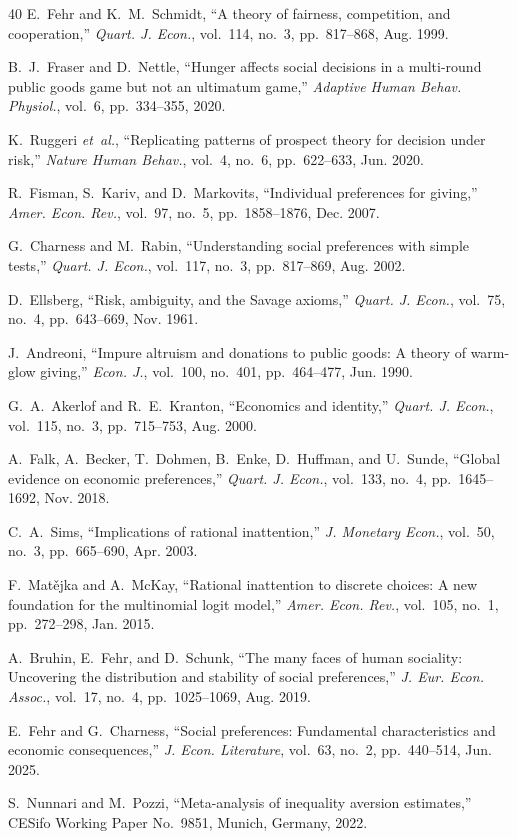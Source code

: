 \documentclass[journal]{IEEEtran}
\begin{document}
\begin{thebibliography}{40}
E.~Fehr and K.~M.~Schmidt, ``A theory of fairness, competition, and cooperation,''
\emph{Quart. J. Econ.}, vol.~114, no.~3, pp.~817--868, Aug. 1999.

B.~J.~Fraser and D.~Nettle, ``Hunger affects social decisions in a multi-round public goods game but not an ultimatum game,''
\emph{Adaptive Human Behav. Physiol.}, vol.~6, pp.~334--355, 2020.

K.~Ruggeri \emph{et~al.}, ``Replicating patterns of prospect theory for decision under risk,''
\emph{Nature Human Behav.}, vol.~4, no.~6, pp.~622--633, Jun. 2020.

R.~Fisman, S.~Kariv, and D.~Markovits, ``Individual preferences for giving,''
\emph{Amer. Econ. Rev.}, vol.~97, no.~5, pp.~1858--1876, Dec. 2007.

G.~Charness and M.~Rabin, ``Understanding social preferences with simple tests,''
\emph{Quart. J. Econ.}, vol.~117, no.~3, pp.~817--869, Aug. 2002.

D.~Ellsberg, ``Risk, ambiguity, and the Savage axioms,''
\emph{Quart. J. Econ.}, vol.~75, no.~4, pp.~643--669, Nov. 1961.

J.~Andreoni, ``Impure altruism and donations to public goods: A theory of warm-glow giving,''
\emph{Econ. J.}, vol.~100, no.~401, pp.~464--477, Jun. 1990.

G.~A.~Akerlof and R.~E.~Kranton, ``Economics and identity,''
\emph{Quart. J. Econ.}, vol.~115, no.~3, pp.~715--753, Aug. 2000.

A.~Falk, A.~Becker, T.~Dohmen, B.~Enke, D.~Huffman, and U.~Sunde, ``Global evidence on economic preferences,''
\emph{Quart. J. Econ.}, vol.~133, no.~4, pp.~1645--1692, Nov. 2018. %

C.~A.~Sims, ``Implications of rational inattention,''
\emph{J. Monetary Econ.}, vol.~50, no.~3, pp.~665--690, Apr. 2003.

F.~Mat\v{e}jka and A.~McKay, ``Rational inattention to discrete choices: A new foundation for the multinomial logit model,''
\emph{Amer. Econ. Rev.}, vol.~105, no.~1, pp.~272--298, Jan. 2015.

A.~Bruhin, E.~Fehr, and D.~Schunk, ``The many faces of human sociality: Uncovering the distribution and stability of social preferences,''
\emph{J. Eur. Econ. Assoc.}, vol.~17, no.~4, pp.~1025--1069, Aug. 2019.

E.~Fehr and G.~Charness, ``Social preferences: Fundamental characteristics and economic consequences,''
\emph{J. Econ. Literature}, vol.~63, no.~2, pp.~440--514, Jun. 2025.

S.~Nunnari and M.~Pozzi, ``Meta-analysis of inequality aversion estimates,''
CESifo Working Paper No.~9851, Munich, Germany, 2022.

\end{thebibliography}

\balance
\end{document}
